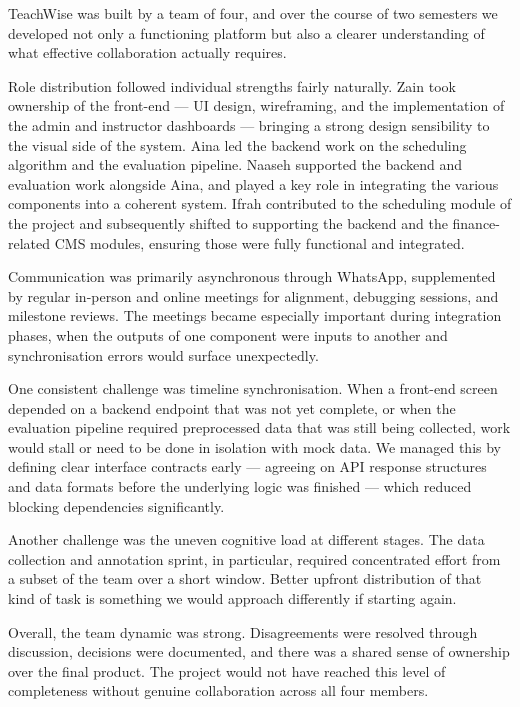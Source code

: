 TeachWise was built by a team of four, and over the course of two semesters we developed not only a functioning platform but also a clearer understanding of what effective collaboration actually requires.

Role distribution followed individual strengths fairly naturally. Zain took ownership of the front-end --- UI design, wireframing, and the implementation of the admin and instructor dashboards --- bringing a strong design sensibility to the visual side of the system. Aina led the backend work on the scheduling algorithm and the evaluation pipeline. Naaseh supported the backend and evaluation work alongside Aina, and played a key role in integrating the various components into a coherent system. Ifrah contributed to the scheduling module of the project and subsequently shifted to supporting the backend and the finance-related CMS modules, ensuring those were fully functional and integrated.

Communication was primarily asynchronous through WhatsApp, supplemented by regular in-person and online meetings for alignment, debugging sessions, and milestone reviews. The meetings became especially important during integration phases, when the outputs of one component were inputs to another and synchronisation errors would surface unexpectedly.

One consistent challenge was timeline synchronisation. When a front-end screen depended on a backend endpoint that was not yet complete, or when the evaluation pipeline required preprocessed data that was still being collected, work would stall or need to be done in isolation with mock data. We managed this by defining clear interface contracts early --- agreeing on API response structures and data formats before the underlying logic was finished --- which reduced blocking dependencies significantly.

Another challenge was the uneven cognitive load at different stages. The data collection and annotation sprint, in particular, required concentrated effort from a subset of the team over a short window. Better upfront distribution of that kind of task is something we would approach differently if starting again.

Overall, the team dynamic was strong. Disagreements were resolved through discussion, decisions were documented, and there was a shared sense of ownership over the final product. The project would not have reached this level of completeness without genuine collaboration across all four members.

